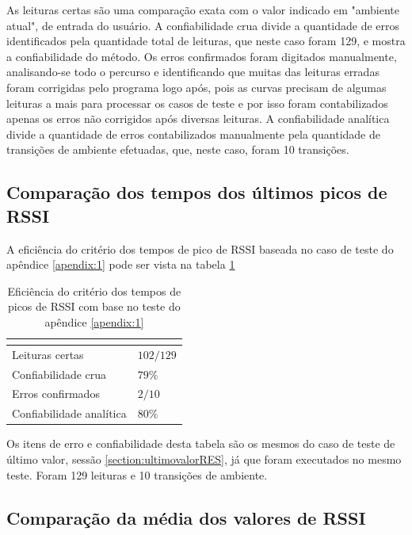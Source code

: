 As leituras certas são uma comparação exata com o valor indicado em "ambiente atual", de entrada do usuário. A confiabilidade crua divide a quantidade de erros identificados pela quantidade total de leituras, que neste caso foram 129, e mostra a confiabilidade do método. Os erros confirmados foram digitados manualmente, analisando-se todo o percurso e identificando que muitas das leituras erradas foram corrigidas pelo programa logo após, pois as curvas precisam de algumas leituras a mais para processar os casos de teste e por isso foram contabilizados apenas os erros não corrigidos após diversas leituras. A confiabilidade analítica divide a quantidade de erros contabilizados manualmente pela quantidade de transições de ambiente efetuadas, que, neste caso, foram 10 transições.


\subsection{Comparação dos tempos dos últimos picos de RSSI}

A eficiência do critério dos tempos de pico de RSSI baseada no caso de teste do apêndice \ref{apendix:1} pode ser vista na tabela \ref{tab:resultados2}

\begin{table}[H]
\centering
\caption{Eficiência do critério dos tempos de picos de RSSI com base no teste do apêndice \ref{apendix:1} }
\label{tab:resultados2}
\begin{tabular}{p{5cm} p{5cm}}
\hline
\multicolumn{2}{c}{\cellcolor{lightgray}{Eficiência do critério: Tempos de pico de RSSI}} \\ \hline
Leituras certas         &   $102 / 129$        \\
Confiabilidade crua    &   $79\%$     \\
Erros confirmados          &  $2 / 10$        \\
Confiabilidade analítica & $80\%$ \\ \hline
\end{tabular}
\end{table}

Os itens de erro e confiabilidade desta tabela são os mesmos do caso de teste de último valor, sessão \ref{section:ultimovalorRES}, já que foram executados no mesmo teste. Foram 129 leituras e 10 transições de ambiente.


\subsection{Comparação da média dos valores de RSSI}

